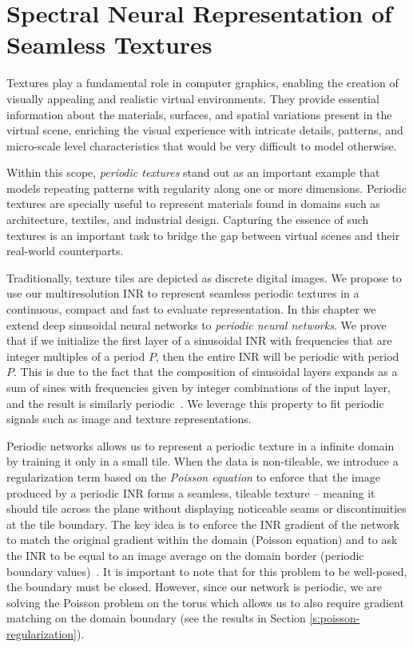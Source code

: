 \chapter{Spectral Neural Representation of Seamless Textures}
\label{chap:seamless-textures}

Textures play a fundamental role in computer graphics, enabling the creation of visually appealing and realistic virtual environments. They provide essential information about the materials, surfaces, and spatial variations present in the virtual scene, enriching the visual experience with intricate details, patterns, and micro-scale level characteristics that would be very difficult to model otherwise.

Within this scope, \textit{periodic textures} stand out as an important example that models repeating patterns with regularity along one or more dimensions. Periodic textures are specially useful to represent materials found in domains such as architecture, textiles, and industrial design. Capturing the essence of such textures is an important task to bridge the gap between virtual scenes and their real-world counterparts.


Traditionally, texture tiles are depicted as discrete digital images. We propose to use our multiresolution INR to represent seamless periodic textures in a continuous, compact and fast to evaluate representation. In this chapter we extend deep sinusoidal neural networks to \textit{periodic neural networks}. We prove that if we initialize the first layer of a sinusoidal INR with frequencies that are integer multiples of a period $P$, then the entire INR will be periodic with period $P$.  This is due to the fact that the composition of sinusoidal layers expands as a sum of sines with frequencies given by integer combinations of the input layer, and the result is similarly periodic~\citep{novello2022understanding, yuce2022structured}. We leverage this property to fit periodic signals such as image and texture representations.


Periodic networks allows us to represent a periodic texture in a infinite domain by training it only in a small tile. When the data is non-tileable, we introduce a regularization term based on the \textit{Poisson equation} to enforce that the image produced by a periodic INR forms a seamless, tileable texture -- meaning it should tile across the plane without displaying noticeable seams or discontinuities at the tile boundary. The key idea is to enforce the INR gradient of the network to match the original gradient within the domain (Poisson equation) and to ask the INR to be equal to an image average on the domain border (periodic boundary values)~\cite{perez2003}. It is important to note that for this problem to be well-posed, the boundary must be closed. However, since our network is periodic, we are solving the Poisson problem on the torus which allows us to also require gradient matching on the domain boundary (see the results in Section \ref{s:poisson-regularization}).

